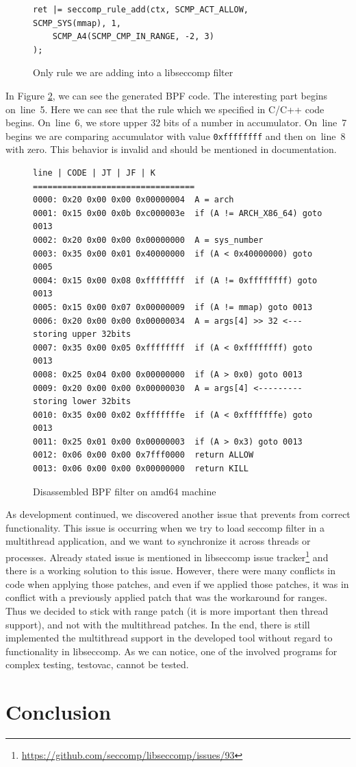 \begin{figure}[h]
	\label{libseccomp_rule}
	\lstset{style=c++}
	\begin{lstlisting}
ret |= seccomp_rule_add(ctx, SCMP_ACT_ALLOW, SCMP_SYS(mmap), 1,
	SCMP_A4(SCMP_CMP_IN_RANGE, -2, 3)
);
	\end{lstlisting}
	\caption{Only rule we are adding into a libseccomp filter}
\end{figure}

In Figure \ref{BPF_rule}, we can see the generated BPF code. The interesting part
begins on~line~5. Here we can see that the rule  which we specified in
C/C++ code begins. On~line~6, we store upper 32 bits of a number in accumulator.
On~line~7 begins we are comparing accumulator with value \texttt{0xffffffff} and then
on~line~8 with zero. This behavior is invalid and should be mentioned in documentation.

\begin{figure}[h]
	\label{BPF_rule}
	\lstset{style=npl}
	\begin{lstlisting}
line | CODE | JT | JF | K
=================================
0000: 0x20 0x00 0x00 0x00000004  A = arch
0001: 0x15 0x00 0x0b 0xc000003e  if (A != ARCH_X86_64) goto 0013
0002: 0x20 0x00 0x00 0x00000000  A = sys_number
0003: 0x35 0x00 0x01 0x40000000  if (A < 0x40000000) goto 0005
0004: 0x15 0x00 0x08 0xffffffff  if (A != 0xffffffff) goto 0013
0005: 0x15 0x00 0x07 0x00000009  if (A != mmap) goto 0013
0006: 0x20 0x00 0x00 0x00000034  A = args[4] >> 32 <--- storing upper 32bits
0007: 0x35 0x00 0x05 0xffffffff  if (A < 0xffffffff) goto 0013
0008: 0x25 0x04 0x00 0x00000000  if (A > 0x0) goto 0013
0009: 0x20 0x00 0x00 0x00000030  A = args[4] <--------- storing lower 32bits
0010: 0x35 0x00 0x02 0xfffffffe  if (A < 0xfffffffe) goto 0013
0011: 0x25 0x01 0x00 0x00000003  if (A > 0x3) goto 0013
0012: 0x06 0x00 0x00 0x7fff0000  return ALLOW
0013: 0x06 0x00 0x00 0x00000000  return KILL
	\end{lstlisting}
	\caption{Disassembled BPF filter on amd64 machine}
\end{figure}

As development continued, we discovered another issue that prevents from correct
functionality. This issue is occurring when we try to load seccomp filter in a
multithread application, and we want to synchronize it across threads or
processes. Already stated issue is mentioned in libseccomp issue
tracker\footnote{\url{https://github.com/seccomp/libseccomp/issues/93}} and
there is a working solution to this issue. However, there were many conflicts in
code when applying those patches, and even if we applied those patches, it was
in conflict with a previously applied patch that was the workaround for ranges.
Thus we decided to stick with range patch (it is more important then thread
support), and not with the multithread patches. In the end, there is still
implemented the multithread support in the developed tool without regard to
functionality in libseccomp. As we can notice, one of the involved programs for
complex testing, testovac, cannot be tested.


\chapter{Conclusion}



